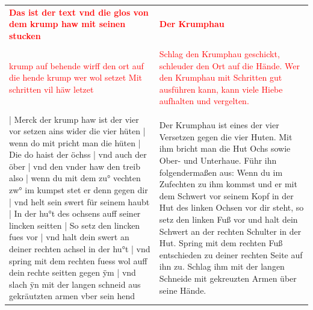 \begin{longtable}{p{6.25cm}p{6.25cm}}
\textbf{\textcolor{red}{Das ist der text vnd die glos von dem krump haw mit seinen stucken}}
&
\textbf{\textcolor{red}{Der Krumphau}}
\\
\\
\textcolor{red}{krump auf behende wirff den ort auf die hende krump wer wol setzet Mit schritten vil häw letzet}
&
\textcolor{red}{Schlag den Krumphau geschickt, schleuder den Ort auf die Hände. Wer den Krumphau mit Schritten gut ausführen kann, kann viele Hiebe aufhalten und vergelten.}
\\
\\
| Merck der krump haw ist der vier vor setzen ains wider die vier hüten | wenn do mit pricht man die hüten | Die do haist der öchss | vnd auch der öber | vnd den vnder haw den treib also | wenn du mit dem zu° vechten zw° im kumpst stet er denn gegen dir | vnd helt sein swert für seinem haubt | In der hu°t des ochsens auff seiner lincken seitten | So setz den lincken fues vor | vnd halt dein swert an deiner rechten achsel in der hu°t | vnd spring mit dem rechten fuess wol auff dein rechte seitten gegen ÿm | vnd slach ÿn mit der langen schneid aus gekräutzten armen vber sein hend
&
Der Krumphau ist eines der vier Versetzen gegen die vier Huten. Mit ihm bricht man die Hut Ochs sowie Ober- und Unterhaue. Führ ihn folgendermaßen aus: Wenn du im Zufechten zu ihm kommst und er mit dem Schwert vor seinem Kopf in der Hut des linken Ochsen vor dir steht, so setz den linken Fuß vor und halt dein Schwert an der rechten Schulter in der Hut. Spring mit dem rechten Fuß entschieden zu deiner rechten Seite auf ihn zu. Schlag ihm mit der langen Schneide mit gekreuzten Armen über seine Hände.
\end{longtable}

\newpage

\begin{center}
\end{center}

\newpage

